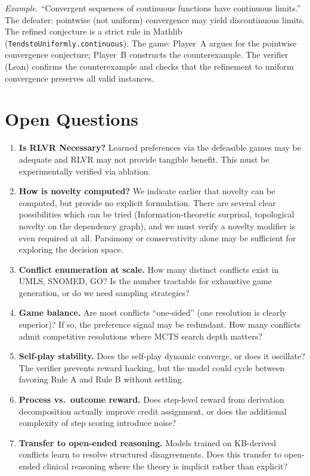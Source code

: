 \documentclass[11pt]{article}
\begin{document}
\textit{Example.} ``Convergent sequences of continuous functions have continuous limits.'' The defeater: pointwise (not uniform) convergence may yield discontinuous limits. The refined conjecture is a strict rule in Mathlib (\texttt{TendstoUniformly.continuous}). The game: Player~A argues for the pointwise convergence conjecture; Player~B constructs the counterexample. The verifier (Lean) confirms the counterexample and checks that the refinement to uniform convergence preserves all valid instances.

\section{Open Questions}

\begin{enumerate}
    \item \textbf{Is RLVR Necessary?} Learned preferences via the defeasible games may be adequate and RLVR may not provide tangible benefit. This must be experimentally verified via ablation.
    \item \textbf{How is novelty computed?} We indicate earlier that novelty can be computed, but provide no explicit formulation. There are several clear possibilities which can be tried (Information-theoretic surprisal, topological novelty on the dependency graph), and we must verify a novelty modifier is even required at all. Parsimony or conservativity alone may be sufficient for exploring the decision space.
    \item \textbf{Conflict enumeration at scale.} How many distinct conflicts exist in UMLS, SNOMED, GO? Is the number tractable for exhaustive game generation, or do we need sampling strategies?
    \item \textbf{Game balance.} Are most conflicts ``one-sided'' (one resolution is clearly superior)? If so, the preference signal may be redundant. How many conflicts admit competitive resolutions where MCTS search depth matters?
    \item \textbf{Self-play stability.} Does the self-play dynamic converge, or does it oscillate? The verifier prevents reward hacking, but the model could cycle between favoring Rule A and Rule B without settling.
    \item \textbf{Process vs.\ outcome reward.} Does step-level reward from derivation decomposition actually improve credit assignment, or does the additional complexity of step scoring introduce noise?
    \item \textbf{Transfer to open-ended reasoning.} Models trained on KB-derived conflicts learn to resolve structured disagreements. Does this transfer to open-ended clinical reasoning where the theory is implicit rather than explicit?

\end{enumerate}
\end{document}
